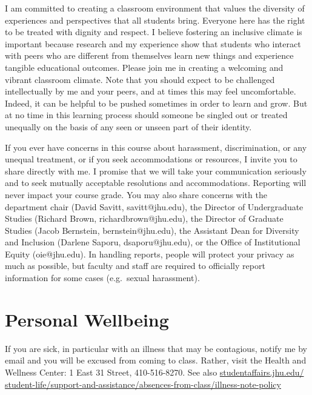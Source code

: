 \documentclass{amsart}
\theoremstyle{definition}
\theoremstyle{remark}
\numberwithin{equation}{section}
\begin{document}
I am committed to creating a classroom environment that values the diversity of experiences and perspectives that all students bring.  Everyone here has the right to be treated with dignity and respect.  I believe fostering an inclusive climate is important because research and my experience show that students who interact with peers who are different from themselves learn new things and experience tangible educational outcomes.  Please join me in creating a welcoming and vibrant classroom climate.  Note that you should expect to be challenged intellectually by me and your peers, and at times this may feel uncomfortable.  Indeed, it can be helpful to be pushed sometimes in order to learn and grow.  But at no time in this learning process should someone be singled out or treated unequally on the basis of any seen or unseen part of their identity.

If you ever have concerns in this course about harassment, discrimination, or any unequal treatment, or if you seek accommodations or resources, I invite you to share directly with me.  I promise that we will take your communication seriously and to seek mutually acceptable resolutions and accommodations.  Reporting will never impact your course grade.  You may also share concerns with the department chair (David Savitt, savitt@jhu.edu), the Director of Undergraduate Studies (Richard Brown, richardbrown@jhu.edu), the Director of Graduate Studies (Jacob Bernstein, bernstein@jhu.edu), the Assistant Dean for Diversity and Inclusion (Darlene Saporu, dsaporu@jhu.edu), or the Office of Institutional Equity (oie@jhu.edu).  In handling reports, people will protect your privacy as much as possible, but faculty and staff are required to officially report information for some cases (e.g.~sexual harassment).


\section*{Personal Wellbeing}

  If you are sick, in particular with an illness that may be contagious, notify me by email and you will be excused from coming to class. Rather, visit the Health and Wellness Center: 1 East 31 Street, 410-516-8270. See also \href{http://studentaffairs.jhu.edu/student-life/support-and-assistance/absences-from-class/illness-note-policy/}{studentaffairs.jhu.edu/
\\ student-life/support-and-assistance/absences-from-class/illness-note-policy}
\end{document}
